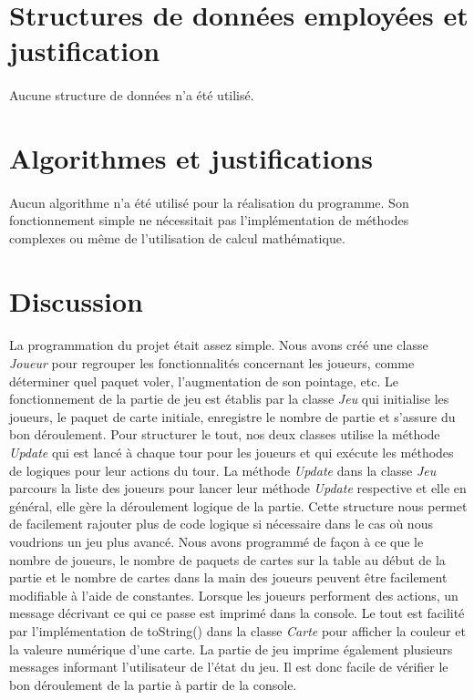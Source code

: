 \documentclass[11pt, french]{article} %
\begin{document}
\section{Structures de données employées et justification}
\paragraph{}
Aucune structure de données n'a été utilisé.



\section{Algorithmes et justifications}
\paragraph{}
Aucun algorithme n'a été utilisé pour la réalisation du programme. Son fonctionnement simple ne nécessitait pas l'implémentation de méthodes complexes ou même de l'utilisation de calcul mathématique.


\section{Discussion}
\paragraph{}
La programmation du projet était assez simple. Nous avons créé une classe \textit{Joueur} pour regrouper les fonctionnalités concernant les joueurs, comme déterminer quel paquet voler, l'augmentation de son pointage, etc. Le fonctionnement de la partie de jeu est établis par la classe \textit{Jeu} qui initialise les joueurs, le paquet de carte initiale, enregistre le nombre de partie et s'assure du bon déroulement. Pour structurer le tout, nos deux classes utilise la méthode \textit{Update} qui est lancé à chaque tour pour les joueurs et qui exécute les méthodes de logiques pour leur actions du tour. La méthode \textit{Update} dans la classe \textit{Jeu} parcours la liste des joueurs pour lancer leur méthode  \textit{Update} respective et elle en général, elle gère la déroulement logique de la partie. Cette structure nous permet de facilement rajouter plus de code logique si nécessaire dans le cas où nous voudrions un jeu plus avancé. Nous avons programmé de façon à ce que le nombre de joueurs, le nombre de paquets de cartes sur la table au début de la partie et le nombre de cartes dans la main des joueurs peuvent être facilement modifiable à l'aide de constantes. Lorsque les joueurs performent des actions, un message décrivant ce qui ce passe est imprimé dans la console. Le tout est facilité par l'implémentation de toString() dans la classe \textit{Carte} pour afficher la couleur et la valeure numérique d'une carte. La partie de jeu imprime également plusieurs messages informant l'utilisateur de l'état du jeu. Il est donc facile de vérifier le bon déroulement de la partie à partir de la console.
\end{document}
